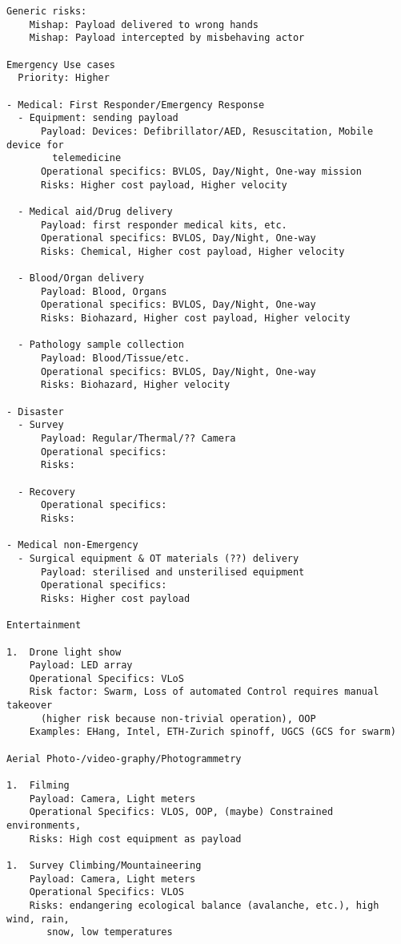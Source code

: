 \documentclass{ua_wgs_base}
\begin{document}
\begin{verbatim}
Generic risks:
    Mishap: Payload delivered to wrong hands
    Mishap: Payload intercepted by misbehaving actor

Emergency Use cases
  Priority: Higher

- Medical: First Responder/Emergency Response
  - Equipment: sending payload
      Payload: Devices: Defibrillator/AED, Resuscitation, Mobile device for 
        telemedicine
      Operational specifics: BVLOS, Day/Night, One-way mission
      Risks: Higher cost payload, Higher velocity

  - Medical aid/Drug delivery
      Payload: first responder medical kits, etc.
      Operational specifics: BVLOS, Day/Night, One-way
      Risks: Chemical, Higher cost payload, Higher velocity

  - Blood/Organ delivery
      Payload: Blood, Organs
      Operational specifics: BVLOS, Day/Night, One-way
      Risks: Biohazard, Higher cost payload, Higher velocity

  - Pathology sample collection
      Payload: Blood/Tissue/etc.
      Operational specifics: BVLOS, Day/Night, One-way
      Risks: Biohazard, Higher velocity
    
- Disaster
  - Survey
      Payload: Regular/Thermal/?? Camera
      Operational specifics: 
      Risks:

  - Recovery
      Operational specifics: 
      Risks:

- Medical non-Emergency
  - Surgical equipment & OT materials (??) delivery
      Payload: sterilised and unsterilised equipment
      Operational specifics: 
      Risks: Higher cost payload

Entertainment

1.  Drone light show
    Payload: LED array
    Operational Specifics: VLoS
    Risk factor: Swarm, Loss of automated Control requires manual takeover 
      (higher risk because non-trivial operation), OOP
    Examples: EHang, Intel, ETH-Zurich spinoff, UGCS (GCS for swarm)

Aerial Photo-/video-graphy/Photogrammetry

1.  Filming
    Payload: Camera, Light meters
    Operational Specifics: VLOS, OOP, (maybe) Constrained environments,
    Risks: High cost equipment as payload

1.  Survey Climbing/Mountaineering
    Payload: Camera, Light meters
    Operational Specifics: VLOS
    Risks: endangering ecological balance (avalanche, etc.), high wind, rain,
       snow, low temperatures
    

\end{verbatim}
\end{document}
